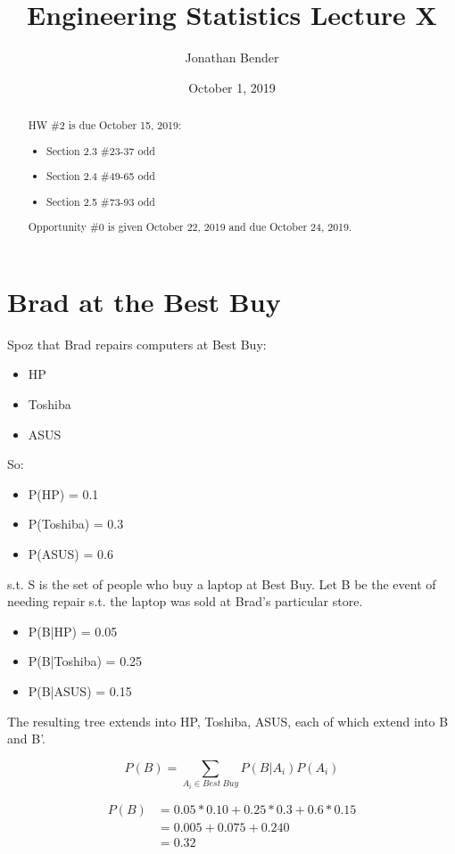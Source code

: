\documentclass[]{article}
\title{Engineering Statistics Lecture X}
\author{Jonathan Bender}
\date{October 1, 2019}
\begin{document}
	
	\maketitle
	
	\begin{abstract}	
		HW \#2 is due October 15, 2019:
		\begin{itemize}
			\item Section 2.3 \#23-37 odd
			\item Section 2.4 \#49-65 odd
			\item Section 2.5 \#73-93 odd
		\end{itemize}
	
		Opportunity \#0 is given October 22, 2019 and due October 24, 2019.
	\end{abstract}
	
	\section{Brad at the Best Buy}
		
		Spoz that Brad repairs computers at Best Buy:
		\begin{itemize}
			\item HP
			\item Toshiba
			\item ASUS
		\end{itemize}
	
		So:
		
		\begin{itemize}
			\item P(HP) = 0.1
			\item P(Toshiba) = 0.3
			\item P(ASUS) = 0.6
		\end{itemize}
		s.t. S is the set of people who buy a laptop at Best Buy.
		Let B be the event of needing repair s.t. the laptop was sold at Brad's particular store.
		
		\begin{itemize}
			\item P(B|HP) = 0.05 
			\item P(B|Toshiba) = 0.25 
			\item P(B|ASUS) = 0.15
		\end{itemize}
	
		The resulting tree extends into HP, Toshiba, ASUS, each of which extend into B and B'.
		
		$$P(B) = \sum_{A_i\in Best\ Buy}P(B|A_i)P(A_i)$$
		
		\begin{align*}
			P(B) &= 0.05*0.10 + 0.25*0.3 + 0.6*0.15 \\
			     &= 0.005 + 0.075 + 0.240 \\
			     &= 0.32
		\end{align*}
	
\end{document}
